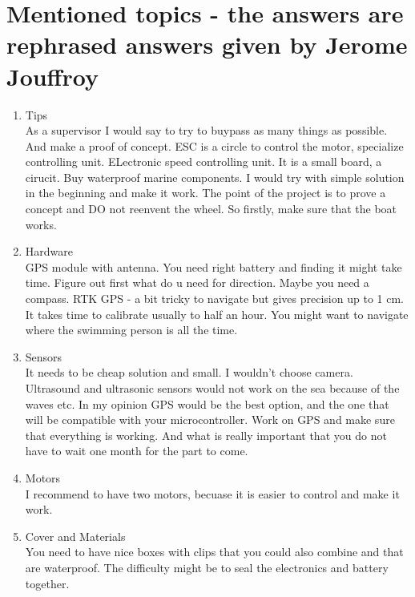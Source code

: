 \section{Mentioned topics - the answers are rephrased answers given by Jerome Jouffroy}
\begin{enumerate}
    \item Tips\\
    As a supervisor I would say to try to buypass as many things as possible. And make a proof of concept. ESC is a circle to control the motor, specialize controlling unit. ELectronic speed controlling unit.
It is a small board, a cirucit. Buy waterproof marine components. I would try with simple solution in the beginning and make it work. The point of the project is to prove a concept and DO not reenvent the wheel. So firstly, make sure that the boat works.
    \item Hardware\\
GPS module with antenna.  You need right battery and finding it might take time. Figure out first what do u need 
for direction. Maybe you need a compass. RTK GPS - a bit tricky to navigate but gives precision up to 1 cm. It takes time to calibrate 
usually to half an hour. You might want to navigate where the swimming person is all the time. 
    \item Sensors\\
It needs to be cheap solution and small. I wouldn't choose camera. Ultrasound and ultrasonic sensors would not work on the sea because of the waves etc. 
In my opinion GPS would be the best option, and the one that will be compatible with your microcontroller. Work on GPS and make sure that everything is working. 
And what is really important that you do not have to wait one month for the part to come. 
    \item Motors\\
I recommend to have two motors, becuase it is easier to control and make it work. 
    \item Cover and Materials\\
You need to have nice boxes with clips that you could also combine and that are waterproof. The difficulty might be to seal the electronics and battery together.

\end{enumerate}
% 

